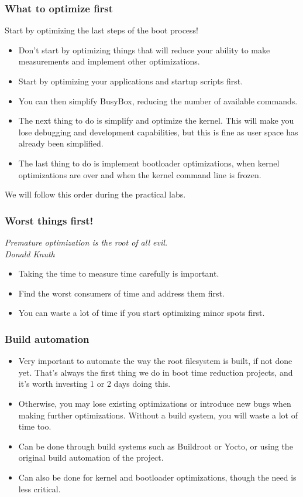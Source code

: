 \begin{frame}
\frametitle{What to optimize first}
Start by optimizing the last steps of the boot process!
\begin{itemize}
\item Don't start by optimizing things that will reduce your ability to
      make measurements and implement other optimizations.
\item Start by optimizing your applications and startup
      scripts first.
\item You can then simplify BusyBox, reducing the number of available
      commands.
\item The next thing to do is simplify and optimize the kernel. This
      will make you lose debugging and development capabilities,
      but this is fine as user space has already been simplified.
\item The last thing to do is implement bootloader optimizations,
      when kernel optimizations are over and when the kernel command
      line is frozen.
\end{itemize}
We will follow this order during the practical labs.
\end{frame}

\begin{frame}
\frametitle{Worst things first!}
{\em Premature optimization is the root of all evil.\\
Donald Knuth}
\begin{itemize}
\item Taking the time to measure time carefully is important.
\item Find the worst consumers of time and address them first.
\item You can waste a lot of time if you start optimizing
      minor spots first.
\end{itemize}
\end{frame}

\begin{frame}
\frametitle{Build automation}
\begin{itemize}
\item Very important to automate the way the root filesystem is built,
      if not done yet. That's always the first thing we do in boot time
      reduction projects, and it's worth investing 1 or 2 days doing
      this.
\item Otherwise, you may lose existing optimizations or introduce new bugs
      when making further optimizations. Without a build system,
      you will waste a lot of time too.
\item Can be done through build systems such as Buildroot or Yocto,
      or using the original build automation of the project.
\item Can also be done for kernel and bootloader optimizations, though
      the need is less critical.
\end{itemize}
\end{frame}

